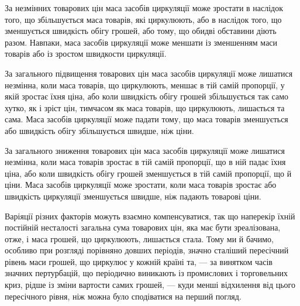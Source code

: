 
За незмінних товарових цін маса засобів циркуляції може
зростати в наслідок того, що збільшується маса товарів, які
циркулюють, або в наслідок того, що зменшується швидкість
обігу грошей, або тому, що обидві обставини діють разом. Навпаки,
маса засобів циркуляції може меншати із зменшенням
маси товарів або із зростом швидкости циркуляції.

За загального підвищення товарових цін маса засобів циркуляції
може лишатися незмінна, коли маса товарів, що циркулюють,
меншає в тій самій пропорції, у якій зростає їхня ціна, або коли
швидкість обігу грошей збільшується так само хутко, як і зріст цін,
тимчасом як маса товарів, що циркулюють, лишається та сама.
Маса засобів циркуляції може падати тому, що маса товарів
зменшується або швидкість обігу збільшується швидше, ніж ціни.

За загального зниження товарових цін маса засобів циркуляції
може лишатися незмінна, коли маса товарів зростає в тій самій
пропорції, що в ній падає їхня ціна, або коли швидкість обігу
грошей зменшується в тій самій пропорції, що й ціни. Маса засобів
циркуляції може зростати, коли маса товарів зростає або швидкість
циркуляції зменшується швидше, ніж падають товарові ціни.

Варіяції різних факторів можуть взаємно компенсуватися,
так що наперекір їхній постійній несталості загальна сума товарових
цін, яка має бути зреалізована, отже, і маса грошей, що
циркулюють, лишається стала. Тому ми й бачимо, особливо при
розгляді порівняно довших періодів, значно сталіший пересічний
рівень маси грошей, що циркулює у кожній країні та, — за
винятком часів значних пертурбацій, що періодично виникають
із промислових і торговельних криз, рідше із зміни вартости
самих грошей, — куди менші відхилення від цього пересічного
рівня, ніж можна було сподіватися на перший погляд.


